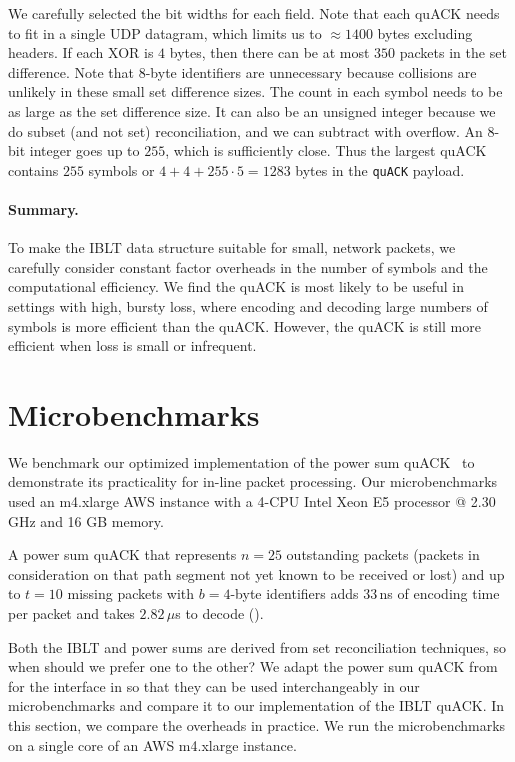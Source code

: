 We carefully selected the bit widths for each field. Note that each quACK needs
to fit in a single UDP datagram, which limits us to $\approx\!1400$ bytes
excluding headers. If each XOR is $4$ bytes, then there can be at most $350$
packets in the set difference. Note that $8$-byte identifiers are unnecessary
because collisions are unlikely in these small set difference sizes. The count
in each symbol needs to be as large as the set difference size. It can also be
an unsigned integer because we do subset (and not set) reconciliation, and we
can subtract with overflow. An 8-bit integer goes up to $255$, which is
sufficiently close. Thus the largest quACK contains $255$ symbols or $4 +
4 + 255 \cdot 5 = 1283$ bytes in the \texttt{quACK} payload.

\paragraph{Summary.}

To make the IBLT data structure suitable for small, network packets, we
carefully consider constant factor overheads in the
number of symbols and the computational efficiency. We find the quACK
is most likely to be useful in settings with high, bursty loss, where
encoding and decoding large numbers of symbols is more efficient than the
quACK. However, the quACK is still more efficient when
loss is small or infrequent.

\section{Microbenchmarks}
\label{sec:quack:microbenchmarks}

We benchmark our optimized implementation of the power sum quACK~\cite{quack-github}
to demonstrate its practicality for in-line packet processing.
Our microbenchmarks used an m4.xlarge AWS instance with a 4-CPU Intel Xeon E5
processor @ 2.30 GHz and 16 GB memory.



A power sum quACK that represents $n=25$ outstanding packets
(packets in consideration on that path segment not yet known to be received or lost)
and up to $t=10$ missing
packets with $b=4$-byte identifiers adds $33$\,ns of encoding time per
packet and takes $2.82$\,$\mu$s to decode ().

Both the IBLT and power sums are derived from set reconciliation
techniques, so when should we prefer one to the other?
We adapt the power sum quACK from \cite{yuan2024sidekick} for the interface
in 
so that they can be used interchangeably in our microbenchmarks and compare
it to our implementation of the IBLT quACK.
In this section, we compare the overheads in practice.
We run the microbenchmarks on a single core of an AWS m4.xlarge instance.

